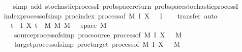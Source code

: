 \begin{isabellebody}
%
\isadelimproof
\ \ %
\endisadelimproof
%
\isatagproof
{}\isamarkupfalse%
\ {\isacharparenleft}{\kern0pt}simp\ add{\isacharcolon}{\kern0pt}\ stochastic{\isacharunderscore}{\kern0pt}processI\ prob{\isacharunderscore}{\kern0pt}space{\isacharunderscore}{\kern0pt}return\ prob{\isacharunderscore}{\kern0pt}space{\isachardot}{\kern0pt}stochastic{\isacharunderscore}{\kern0pt}processI{\isacharparenright}{\kern0pt}%
\endisatagproof
{\isafoldproof}%
%
\isadelimproof
\isanewline
%
\endisadelimproof
\isanewline
{}\isamarkupfalse%
\ index{\isacharunderscore}{\kern0pt}process{\isacharunderscore}{\kern0pt}of{\isacharbrackleft}{\kern0pt}simp{\isacharbrackright}{\kern0pt}{\isacharcolon}{\kern0pt}\ {\isachardoublequoteopen}proc{\isacharunderscore}{\kern0pt}index\ {\isacharparenleft}{\kern0pt}process{\isacharunderscore}{\kern0pt}of\ M{\isacharprime}{\kern0pt}\ I\ X\ {\isasymomega}{\isacharparenright}{\kern0pt}\ {\isacharequal}{\kern0pt}\ I{\isachardoublequoteclose}\isanewline
%
\isadelimproof
\ \ %
\endisadelimproof
%
\isatagproof
{}\isamarkupfalse%
\ {\isacharparenleft}{\kern0pt}transfer{\isacharcomma}{\kern0pt}\ auto{\isacharparenright}{\kern0pt}%
\endisatagproof
{\isafoldproof}%
%
\isadelimproof
\isanewline
%
\endisadelimproof
\isanewline
{}\isamarkupfalse%
\isanewline
\ \ \ {\isachardoublequoteopen}{\isasymforall}t\ {\isasymin}\ I{\isachardot}{\kern0pt}\ X\ t\ {\isasymin}\ M\ {\isasymrightarrow}\isactrlsub M\ M{\isacharprime}{\kern0pt}{\isachardoublequoteclose}\ {\isachardoublequoteopen}{\isasymomega}\ {\isasymin}\ space\ M{\isacharprime}{\kern0pt}{\isachardoublequoteclose}\isanewline
\ \ \isanewline
\ \ \ \ source{\isacharunderscore}{\kern0pt}process{\isacharunderscore}{\kern0pt}of{\isacharbrackleft}{\kern0pt}simp{\isacharbrackright}{\kern0pt}{\isacharcolon}{\kern0pt}\ {\isachardoublequoteopen}proc{\isacharunderscore}{\kern0pt}source\ {\isacharparenleft}{\kern0pt}process{\isacharunderscore}{\kern0pt}of\ M{\isacharprime}{\kern0pt}\ I\ X\ {\isasymomega}{\isacharparenright}{\kern0pt}\ {\isacharequal}{\kern0pt}\ M{\isachardoublequoteclose}\ \isanewline
\ \ \ \ target{\isacharunderscore}{\kern0pt}process{\isacharunderscore}{\kern0pt}of{\isacharbrackleft}{\kern0pt}simp{\isacharbrackright}{\kern0pt}{\isacharcolon}{\kern0pt}\ {\isachardoublequoteopen}proc{\isacharunderscore}{\kern0pt}target\ {\isacharparenleft}{\kern0pt}process{\isacharunderscore}{\kern0pt}of\ M{\isacharprime}{\kern0pt}\ I\ X\ {\isasymomega}{\isacharparenright}{\kern0pt}\ {\isacharequal}{\kern0pt}\ M{\isacharprime}{\kern0pt}{\isachardoublequoteclose}\ \isanewline

\end{isabellebody}
